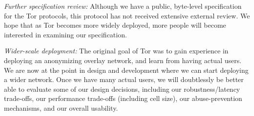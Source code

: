 \documentclass[times,10pt,twocolumn]{article}
\begin{document}
\emph{Further specification review:} Although we have a public,
byte-level specification for the Tor protocols, this protocol has
not received extensive external review.  We hope that as Tor
becomes more widely deployed, more people will become interested in
examining our specification.

\emph{Wider-scale deployment:} The original goal of Tor was to
gain experience in deploying an anonymizing overlay network, and
learn from having actual users.  We are now at the point in design
and development where we can start deploying a wider network.  Once
we have many actual users, we will doubtlessly be better
able to evaluate some of our design decisions, including our
robustness/latency trade-offs, our performance trade-offs (including
cell size), our abuse-prevention mechanisms, and
our overall usability.






\end{document}
